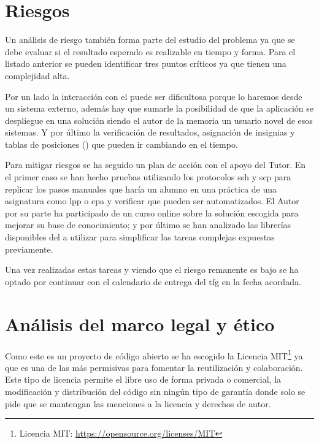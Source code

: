 \documentclass[11pt,spanish,listoffigures,listoftables]{tfgetsinf}
\begin{document}
\section{Riesgos}

Un análisis de riesgo también forma parte del estudio del problema ya que se debe evaluar si el resultado esperado es realizable en tiempo y forma. Para el listado anterior se pueden identificar tres puntos críticos ya que tienen una complejidad alta.

Por un lado la interacción con el  \kahan puede ser dificultosa porque lo haremos desde un sistema externo, además hay que sumarle la posibilidad de que la aplicación se despliegue en una solución  siendo el autor de la memoria un usuario novel de esos sistemas. Y por último la verificación de resultados, asignación de \gls{insignia}s y tablas de posiciones () que pueden ir cambiando en el tiempo.

Para mitigar riesgos se ha seguido un plan de acción con el apoyo del Tutor. En el primer caso se han hecho pruebas utilizando los protocolos \acrshort{ssh} y \acrfull{scp} para replicar los pasos manuales que haría un \gls{alumno} en una práctica de una asignatura como \acrshort{lpp} o \acrshort{cpa} y verificar que pueden ser automatizados. El Autor por su parte ha participado de un curso online \cite{link-coursera-google} sobre la solución  escogida para mejorar su base de conocimiento; y por último se han analizado las librerías disponibles del  a utilizar para simplificar las tareas complejas expuestas previamente.

Una vez realizadas estas tareas y viendo que el riesgo remanente es bajo se ha optado por continuar con el calendario de entrega del \acrshort{tfg} en la fecha acordada.

\section{Análisis del marco legal y ético}

Como este es un proyecto de código abierto se ha escogido la Licencia MIT\footnote{Licencia MIT: \url{https://opensource.org/licenses/MIT}} ya que es una de las más permisivas para fomentar la reutilización y colaboración. Este tipo de licencia permite el libre uso de forma privada o comercial, la modificación y distribución del código sin ningún tipo de garantía donde solo se pide que se mantengan las menciones a la licencia y derechos de autor.
\end{document}
